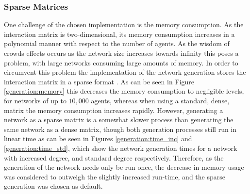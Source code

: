 \documentclass[a4paper, 12pt]{report}
\begin{document}
\newpage

\subsubsection{Sparse Matrices}

One challenge of the chosen implementation is the memory consumption. As the interaction matrix is two-dimensional, its memory consumption increases in a polynomial manner with respect to the number of agents. As the wisdom of crowds effects occurs as the network size increases towards infinity this poses a problem, with large networks consuming large amounts of memory. In order to circumvent this problem the implementation of the network generation stores the interaction matrix in a sparse format \parencite{2020SciPy-NMeth}. As can be seen in Figure \ref{generation:memory} this decreases the memory consumption to negligible levels, for networks of up to $10,000$ agents, whereas when using a standard, dense, matrix the memory consumption increases rapidly. \newline
However, generating a network as a sparse matrix is a somewhat slower process than generating the same network as a dense matrix, though both generation processes still run in linear time as can be seen in Figures \ref{generation:time_inc} and \ref{generation:time_std},  which show the network generation times for a network with increased degree, and standard degree respectively. Therefore, as the generation of the network needs only be run once, the decrease in memory usage was considered to outweigh the slightly increased run-time, and the sparse generation was chosen as default.
\end{document}
